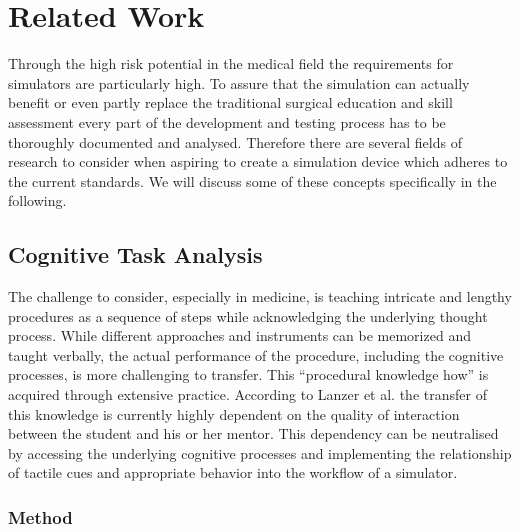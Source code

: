 \chapter{Related Work}\label{relatedwork}

Through the high risk potential in the medical field the requirements for simulators are particularly high. To assure that the simulation can actually benefit or even partly replace the traditional surgical education and skill assessment every part of the development and testing process has to be thoroughly documented and analysed. Therefore there are several fields of research to consider when aspiring to create a simulation device which adheres to the current standards. We will discuss some of these concepts specifically in the following. 

\section{Cognitive Task Analysis}

The challenge to consider, especially in medicine, is teaching intricate and lengthy procedures as a sequence of steps while acknowledging the underlying thought process. While different approaches and instruments can be memorized and taught verbally, the actual performance of the procedure, including the cognitive processes, is more challenging to transfer. This “procedural knowledge how” is acquired through extensive practice. According to Lanzer et al. the transfer of this knowledge is currently highly dependent on the quality of interaction between the student and his or her mentor.\parencite{niels_taatgen_procedural_2013} This dependency can be neutralised by accessing the underlying cognitive processes and implementing the relationship of tactile cues and appropriate behavior into the workflow of a simulator\parencite{cannon-bowers_using_2013}.

\subsection{Method}

